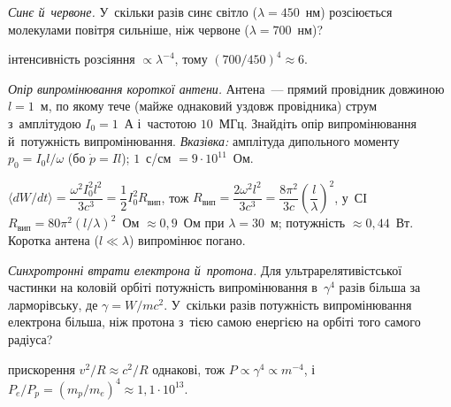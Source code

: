 \begin{problem}\label{prb:BlueRed}
	\emph{Синє й~червоне.} У~скільки разів синє світло ($\lambda=450$~нм) розсіюється молекулами повітря сильніше, ніж червоне
	($\lambda=700$~нм)?
	\begin{solution}
		інтенсивність розсіяння $\propto\lambda^{-4}$, тому $(700/450)^4\approx6$.
	\end{solution}
\end{problem}

\begin{problem}\label{prb:ShortAntenna}
	\emph{Опір випромінювання короткої антени.} Антена~--- прямий провідник довжиною $l=1$~м, по якому тече (майже однаковий
	уздовж провідника) струм з~амплітудою $I_0=1$~А і~частотою $10$~МГц. Знайдіть опір випромінювання й~потужність випромінювання.
	\emph{Вказівка:} амплітуда дипольного моменту $p_0=I_0l/\omega$ (бо $\dot p=Il$); $1$~с/см $=9\cdot10^{11}$~Ом.
	\begin{solution}
		$\langle dW/dt\rangle=\dfrac{\omega^2I_0^2l^2}{3c^3}=\dfrac12I_0^2R_\text{вип}$, тож $R_\text{вип}=\dfrac{2\omega^2l^2}{3c^3}=\dfrac{8\pi^2}{3c}\left(\dfrac l\lambda\right)^2$, у~СІ $R_\text{вип}=80\pi^2(l/\lambda)^2$~Ом $\approx0{,}9$~Ом при $\lambda=30$~м; потужність $\approx0{,}44$~Вт. Коротка антена ($l\ll\lambda$) випромінює погано.
	\end{solution}
\end{problem}

\begin{problem}\label{prb:SynchrotronRatio}
	\emph{Синхротронні втрати електрона й~протона.} Для ультрарелятивістської частинки на коловій орбіті потужність
	випромінювання в~$\gamma^4$ разів більша за ларморівську, де $\gamma=W/mc^2$. У~скільки разів потужність випромінювання
	електрона більша, ніж протона з~тією самою енергією на орбіті того самого радіуса?
	\begin{solution}
		прискорення $v^2/R\approx c^2/R$ однакові, тож $P\propto\gamma^4\propto m^{-4}$, і~$P_e/P_p=(m_p/m_e)^4\approx1{,}1\cdot10^{13}$.
	\end{solution}
\end{problem}

